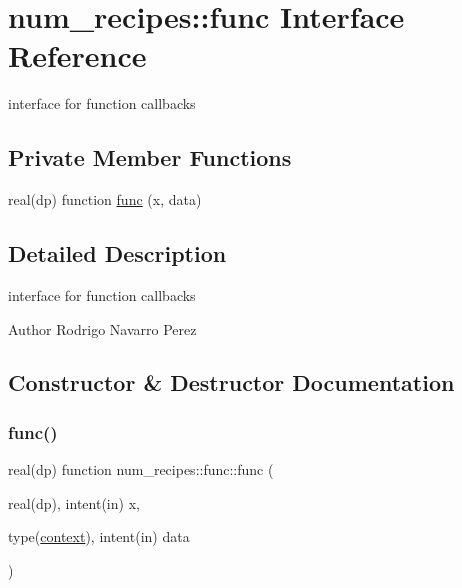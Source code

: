 \hypertarget{interfacenum__recipes_1_1func}{}\section{num\+\_\+recipes\+:\+:func Interface Reference}
\label{interfacenum__recipes_1_1func}


interface for function callbacks  


\subsection*{Private Member Functions}
\begin{DoxyCompactItemize}
\item 
real(dp) function \hyperlink{interfacenum__recipes_1_1func_aae3fffc76c0ea9454ebba89215433663}{func} (x, data)
\end{DoxyCompactItemize}


\subsection{Detailed Description}
interface for function callbacks 

\begin{DoxyAuthor}{Author}
Rodrigo Navarro Perez 
\end{DoxyAuthor}


\subsection{Constructor \& Destructor Documentation}
\mbox{\label{interfacenum__recipes_1_1func_aae3fffc76c0ea9454ebba89215433663}} 
\subsubsection{\texorpdfstring{func()}{func()}}
{\footnotesize\ttfamily real(dp) function num\+\_\+recipes\+::func\+::func (\begin{DoxyParamCaption}\item[{real(dp), intent(in)}]{x,  }\item[{type(\hyperlink{structnum__recipes_1_1context}{context}), intent(in)}]{data }\end{DoxyParamCaption})\hspace{0.3cm}{\ttfamily [private]}}


